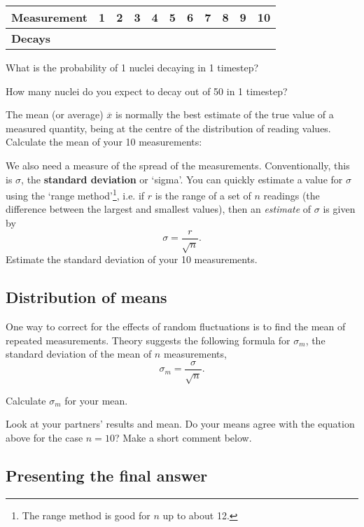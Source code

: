 \noindent\begin{tabular}{|l|p{0.9cm}|p{0.9cm}|p{0.9cm}|p{0.9cm}|p{0.9cm}|p{0.9cm}|p{0.9cm}|p{0.9cm}|p{0.9cm}|p{0.9cm}|}
\hline
{\bf Measurement} & 1 & 2 & 3 & 4 & 5&6&7&8&9&10\\
\hline
{\bf Decays} &&&&&&&&&&\\
\hline
\end{tabular}

\begin{questions}
\question What is the probability of 1 nuclei decaying in 1 timestep? \answerline

\question How many nuclei do you expect to decay out of 50 in 1 timestep? \answerline

The mean (or average) $\overline{x}$ is normally the best estimate of the true value of a measured quantity, being at the centre of the distribution of reading values. \question Calculate the mean of your 10 measurements: \answerline

We also need a measure of the spread of the measurements.  Conventionally, this is $\sigma$, the {\bf standard deviation} or `sigma'.  You can quickly estimate a value for $\sigma$ using the `range method'\footnote{The range method is good for $n$ up to about 12.}, i.e. if $r$ is the range of a set of $n$ readings (the difference between the largest and smallest values), then an \emph{estimate} of $\sigma$ is given by
\[\sigma=\frac{r}{\sqrt{n}}.\]
\question Estimate the standard deviation of your 10 measurements. \answerline

\subsection{Distribution of means}

One way to correct for the effects of random fluctuations is to find the mean of repeated measurements.  Theory suggests the following formula for $\sigma_{m}$, the standard deviation of the mean of $n$ measurements,
\[\sigma_{m}=\frac{\sigma}{\sqrt{n}}.\]

\question Calculate $\sigma_{m}$ for your mean. \answerline

\question Look at your partners' results and mean.  Do your means agree with the equation above for the case $n=10$?  Make a short comment below.

\fillwithlines{3cm}

\subsection{Presenting the final answer}


\end{questions}
